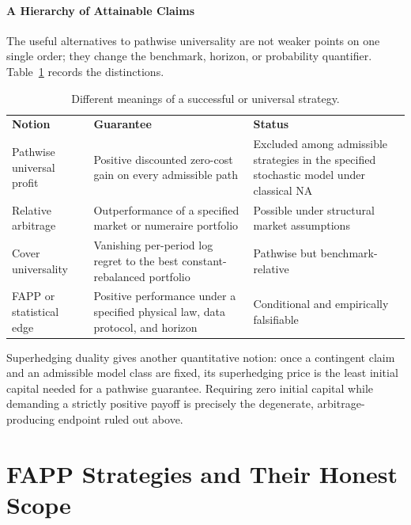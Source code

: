 \documentclass[aps,pra,reprint,superscriptaddress,amsmath,amssymb,floatfix]{revtex4-2}
\theoremstyle{plain}
\theoremstyle{definition}
\theoremstyle{remark}
\begin{document}
\paragraph{A Hierarchy of Attainable Claims}

The useful alternatives to pathwise universality are not weaker points on one
single order; they change the benchmark, horizon, or probability quantifier.
Table~\ref{tab:hierarchy} records the distinctions.

\begin{table}[ht]
\caption{\label{tab:hierarchy}Different meanings of a successful or universal strategy.}
\centering
\begin{ruledtabular}
\begin{tabular}{p{}p{}p{}}
\textbf{Notion} & \textbf{Guarantee} & \textbf{Status} \\
\colrule
Pathwise universal profit
& Positive discounted zero-cost gain on every admissible path
& Excluded among admissible strategies in the specified stochastic model under classical NA \\
Relative arbitrage
& Outperformance of a specified market or numeraire portfolio
& Possible under structural market assumptions \\
Cover universality
& Vanishing per-period log regret to the best constant-rebalanced portfolio
& Pathwise but benchmark-relative \\
FAPP or statistical edge
& Positive performance under a specified physical law, data protocol, and horizon
& Conditional and empirically falsifiable \\
\end{tabular}
\end{ruledtabular}
\end{table}

Superhedging duality gives another quantitative notion: once a contingent
claim and an admissible model class are fixed, its superhedging price is the
least initial capital needed for a pathwise guarantee. Requiring zero initial
capital while demanding a strictly positive payoff is precisely the
degenerate, arbitrage-producing endpoint ruled out above.

\section{FAPP Strategies and Their Honest Scope}
\label{sec:fapp}
\end{document}
